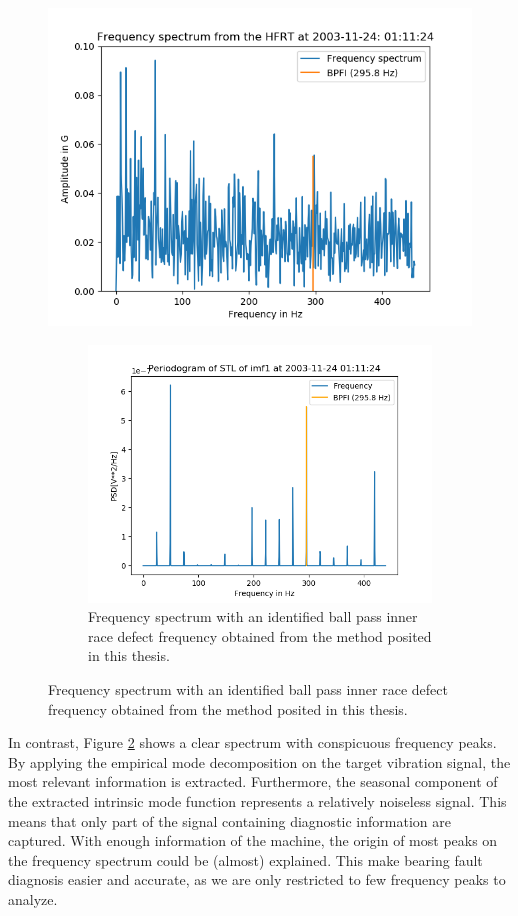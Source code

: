 \documentclass[../Main/thesis.tex]{subfiles}
\begin{document}
	\begin{figure}[H]
		\centering
		\includegraphics[width=0.7\linewidth]{../fig/hfrt}
		\caption{Frequency spectrum with an identified ball pass inner race defect frequency obtained from the high frequency resonance technique (HFRT).}
		\label{fig:hfrt-method}
		
		\begin{figure}[H]
			\centering
			\includegraphics[width=0.7\linewidth]{../fig/periodogram_bpfi/end_imf1_bpfi}
			\caption{Frequency spectrum with an identified ball pass inner race defect frequency obtained from the method posited in this thesis.}
			\label{fig:yapi-method}
		\end{figure}
	\end{figure}
\justify
In contrast, Figure \ref{fig:yapi-method} shows a clear spectrum with conspicuous frequency peaks. By applying the empirical mode decomposition on the target vibration signal, the most relevant information is extracted. Furthermore, the seasonal component of the extracted intrinsic mode function represents a relatively noiseless signal. This means that only part of the signal containing diagnostic information are captured. With enough information of the machine, the origin of most peaks on the frequency spectrum could be (almost) explained. 
This make bearing fault diagnosis easier and accurate, as we are only restricted to few frequency peaks to analyze.
\end{document}
